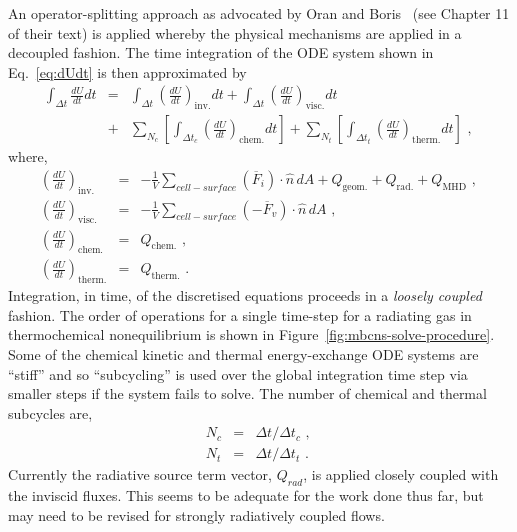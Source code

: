 \medskip 
An operator-splitting approach as advocated by Oran and Boris~\cite{OB2001} (see Chapter 11 of their text) 
is applied whereby the physical mechanisms are applied in a decoupled fashion.
The time integration of the ODE system shown in Eq.~\ref{eq:dUdt} is then approximated by
\begin{eqnarray}
 \int_{\Delta t} \frac{dU}{dt} dt &=& \int_{\Delta t} \left ( \frac{dU}{dt} \right )_{\text{inv.}} dt + \int_{\Delta t} \left ( \frac{dU}{dt} \right )_{\text{visc.}} dt \nonumber \\ 
 &+& \sum_{N_{c}} \left [ \int_{\Delta t_{c}} \left ( \frac{dU}{dt} \right )_{\text{chem.}} dt \right ] + \sum_{N_{t}} \left [ \int_{\Delta t_{t}} \left ( \frac{dU}{dt} \right )_{\text{therm.}} dt \right ] \text{ , }
 \label{eq:dUdt_sum}
\end{eqnarray}
where,
\begin{eqnarray}
 \left ( \frac{dU}{dt} \right )_{\text{inv.}} &=& - \frac{1}{V} \sum_{cell-surface} \left ( \overline{F}_{i} \right ) \cdot \hat{n} \, dA + Q_{\text{geom.}} + Q_{\text{rad.}} + Q_{\text{MHD}} \text{ , } \label{eq:dUdt_inv} \\
 \left ( \frac{dU}{dt} \right )_{\text{visc.}}  &=& - \frac{1}{V} \sum_{cell-surface} \left ( - \overline{F}_{v} \right ) \cdot \hat{n} \, dA \text{ , } \label{eq:dUdt_visc} \\
 \left ( \frac{dU}{dt} \right )_{\text{chem.}}    &=& Q_{\text{chem.}} \text{ , } \label{eq:dUdt_chem} \\
 \left ( \frac{dU}{dt} \right )_{\text{therm.}}   &=& Q_{\text{therm.}} \text{ . } \label{eq:dUdt_therm}
\end{eqnarray}
%
Integration, in time, of the discretised equations proceeds in a \textit{loosely coupled} fashion.
The order of operations for a single time-step for a radiating gas in thermochemical nonequilibrium is
shown in Figure~\ref{fig:mbcns-solve-procedure}.
Some of the chemical kinetic and thermal energy-exchange ODE systems are 
``stiff'' and so ``subcycling'' is used over the global integration 
time step via smaller steps if the system fails to solve.
The number of chemical and thermal subcycles are,
\begin{eqnarray}
 N_{c} &=& \Delta t / \Delta t_{c} \text{ , } \nonumber \\ 
 N_{t} &=& \Delta t / \Delta t_{t} \text{ . } \nonumber
\end{eqnarray}
Currently the radiative source term vector, $Q_{rad}$, is applied closely coupled with the inviscid fluxes. 
This seems to be adequate for the work done thus far, 
but may need to be revised for strongly radiatively coupled flows.  

